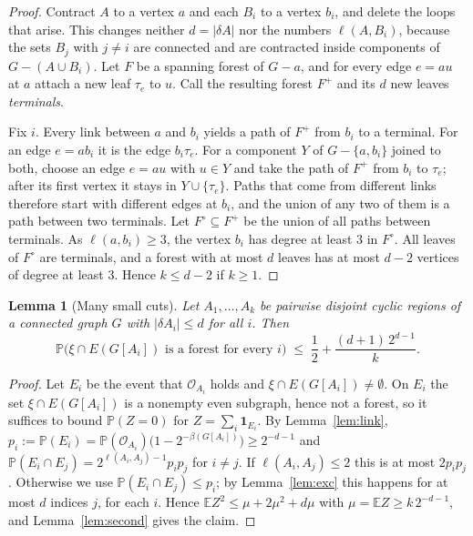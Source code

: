 \documentclass[11pt]{article}
\newtheorem{lemma}[theorem]{Lemma}
\theoremstyle{definition}
\theoremstyle{remark}
\newcommand{\PP}{\mathbb{P}}
\newcommand{\EE}{\mathbb{E}}
\newcommand{\cO}{\mathcal{O}}
\numberwithin{equation}{section}
\begin{document}
\begin{proof}
Contract $A$ to a vertex $a$ and each $B_i$ to a vertex $b_i$, and delete the loops that arise.
This changes neither $d=|\delta A|$ nor the numbers $\ell(A,B_i)$, because the sets $B_j$ with
$j\ne i$ are connected and are contracted inside components of $G-(A\cup B_i)$. Let $F$ be a spanning forest of
$G-a$, and for every edge $e=au$ at $a$ attach a new leaf $\tau_e$ to $u$. Call the resulting forest
$F^{+}$ and its $d$ new leaves \emph{terminals}.

Fix $i$. Every link between $a$ and $b_i$ yields a path of $F^{+}$ from $b_i$ to a terminal. For an
edge $e=ab_i$ it is the edge $b_i\tau_e$. For a component $Y$ of $G-\{a,b_i\}$ joined to both, choose
an edge $e=au$ with $u\in Y$ and take the path of $F^{+}$ from $b_i$ to $\tau_e$; after its first
vertex it stays in $Y\cup\{\tau_e\}$. Paths that come from different links therefore start with
different edges at $b_i$, and the union of any two of them is a path between two terminals. Let
$F^{\circ}\subseteq F^{+}$ be the union of all paths between terminals. As $\ell(a,b_i)\ge3$, the
vertex $b_i$ has degree at least $3$ in $F^{\circ}$. All leaves of $F^{\circ}$ are terminals, and a
forest with at most $d$ leaves has at most $d-2$ vertices of degree at least $3$. Hence $k\le d-2$ if $k\ge1$.
\end{proof}

\begin{lemma}[Many small cuts]\label{lem:smallcuts}
Let $A_1,\dots,A_k$ be pairwise disjoint cyclic regions of a connected graph $G$ with
$|\delta A_i|\le d$ for all $i$. Then
\[
  \PP\bigl(\xi\cap E(G[A_i])\text{ is a forest for every }i\bigr)\;\le\;\frac12+\frac{(d+1)\,2^{d-1}}{k}.
\]
\end{lemma}

\begin{proof}
Let $E_i$ be the event that $\cO_{A_i}$ holds and $\xi\cap E(G[A_i])\ne\emptyset$. On $E_i$ the set
$\xi\cap E(G[A_i])$ is a nonempty even subgraph, hence not a forest, so it suffices to bound
$\PP(Z=0)$ for $Z=\sum_i\mathbf{1}_{E_i}$. By Lemma~\ref{lem:link},
$p_i:=\PP(E_i)=\PP(\cO_{A_i})\bigl(1-2^{-\beta(G[A_i])}\bigr)\ge2^{-d-1}$ and
$\PP(E_i\cap E_j)=2^{\ell(A_i,A_j)-1}p_ip_j$ for $i\ne j$. If $\ell(A_i,A_j)\le2$ this is at most
$2p_ip_j$. Otherwise we use $\PP(E_i\cap E_j)\le p_i$; by Lemma~\ref{lem:exc} this happens for at
most $d$ indices $j$, for each $i$. Hence $\EE Z^{2}\le\mu+2\mu^{2}+d\mu$ with
$\mu=\EE Z\ge k\,2^{-d-1}$, and Lemma~\ref{lem:second} gives the claim.
\end{proof}
\end{document}
